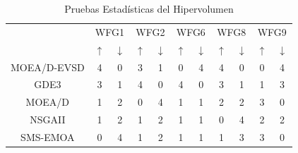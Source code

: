  
\begin{table}[]
\centering
\scriptsize
\caption{Pruebas Estadísticas del Hipervolumen}
\label{table:StatisticalTest_Mating}
\begin{tabular}{c|c|c|c|c|c|c|c|c|c|c|}
\cline{2-11}
\multicolumn{1}{l|}{} & \multicolumn{2}{c|}{WFG1} & \multicolumn{2}{c|}{WFG2} & \multicolumn{2}{c|}{WFG6} & \multicolumn{2}{c|}{WFG8} & \multicolumn{2}{c|}{WFG9} \\ \cline{2-11} 
\multicolumn{1}{l|}{} & $\uparrow$ & $\downarrow$ & $\uparrow$ & $\downarrow$ & $\uparrow$ & $\downarrow$ & $\uparrow$ & $\downarrow$ & $\uparrow$ & $\downarrow$ \\ \hline
\multicolumn{1}{|c|}{MOEA/D-EVSD} & 4 & 0 & 3 & 1 & 0 & 4 & 4 & 0 & 0 & 4 \\ \hline
\multicolumn{1}{|c|}{GDE3} & 3 & 1 & 4 & 0 & 4 & 0 & 3 & 1 & 1 & 3 \\ \hline
\multicolumn{1}{|c|}{MOEA/D} & 1 & 2 & 0 & 4 & 1 & 1 & 2 & 2 & 3 & 0 \\ \hline
\multicolumn{1}{|c|}{NSGAII} & 1 & 2 & 1 & 2 & 1 & 1 & 0 & 4 & 2 & 2 \\ \hline
\multicolumn{1}{|c|}{SMS-EMOA} & 0 & 4 & 1 & 2 & 1 & 1 & 1 & 3 & 3 & 0 \\ \hline
\end{tabular}%
\end{table}
   

